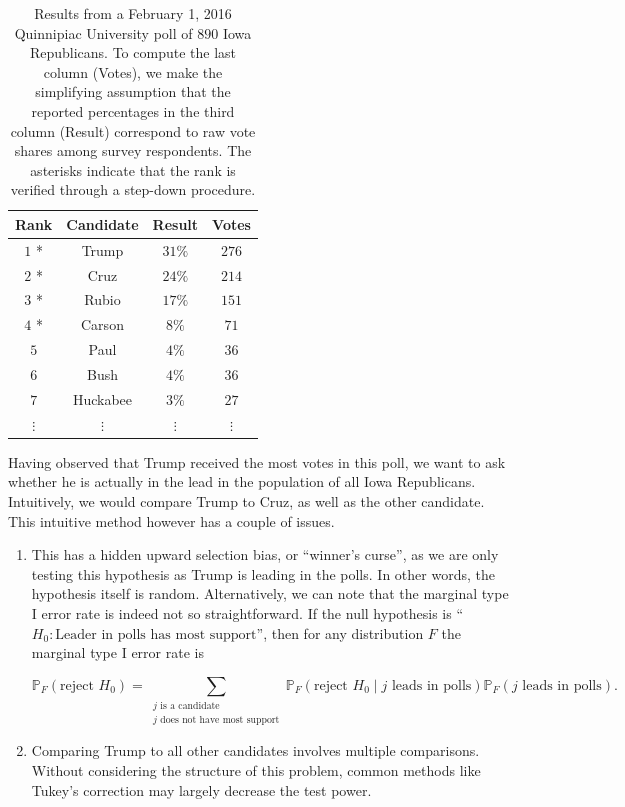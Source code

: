 \documentclass[11pt]{article}
\newcommand{\PP}{\mathbb{P}}
\begin{document}
\begin{table}[htbp]
\begin{center}
\begin{tabular}{c c c c}
	\hline
	Rank & Candidate & Result & Votes \\
	\hline
	$1$ * & Trump & $31\%$ & $276$ \\
	$2$ * & Cruz & $24\%$ & $214$ \\
	$3$ * & Rubio & $17\%$ & $151$ \\
	$4$ * & Carson & $8\%$ & $71$ \\
	$5$ & Paul & $4\%$ & $36$ \\
	$6$ & Bush & $4\%$ & $36$ \\
	$7$ & Huckabee & $3\%$ & $27$ \\
	$\vdots$ & $\vdots$ & $\vdots $ & $\vdots$ \\
	\hline
\end{tabular}
\end{center}
\caption{Results from a February 1, 2016 Quinnipiac University poll of $890$ Iowa Republicans. To compute the last column (Votes), we make the simplifying assumption that the reported percentages in the third column (Result) correspond to raw vote shares among survey respondents. The asterisks indicate that the rank is verified through a step-down procedure.}
\label{tbl:poll}
\end{table}

Having observed that Trump received the most votes in this poll, we want to ask whether he is actually in the lead in the population of all Iowa Republicans. Intuitively, we would compare Trump to Cruz, as well as the other candidate. This intuitive method however has a couple of issues.

\begin{enumerate}

\item This has a hidden upward selection bias, or ``winner's curse'', as we are only testing this hypothesis as Trump is leading in the polls. In other words, the hypothesis itself is random. Alternatively, we can note that the marginal type I error rate is indeed not so straightforward. If the null hypothesis is ``$H_0: \text{Leader in polls has most support}$'', then for any distribution $F$ the marginal type I error rate is

\begin{equation}
\PP_F\left(\text{reject } H_0\right) = \sum_{\substack{j \text{ is a candidate} \\ j \text{ does not have most support}}} \PP_F\left(\text{reject } H_0 \middle| j \text{ leads in polls}\right) \PP_F \left(j \text{ leads in polls}\right).
\label{eqn:marginal_error}
\end{equation}

\item Comparing Trump to all other candidates involves multiple comparisons. Without considering the structure of this problem, common methods like Tukey's correction \cite{Tukey:1951} may largely decrease the test power.

\end{enumerate}
\end{document}
